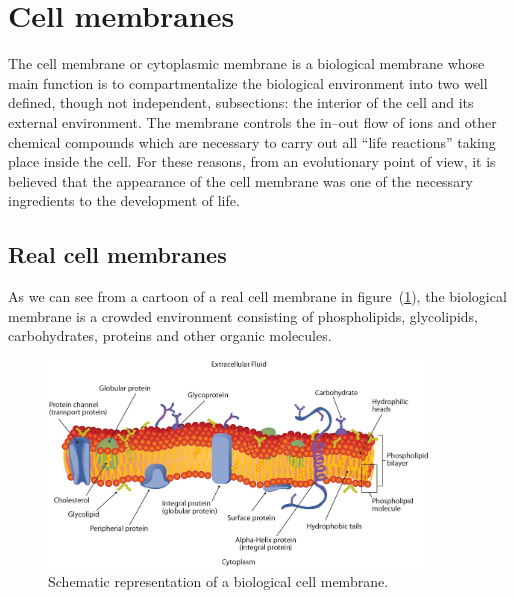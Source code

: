 \section{Cell membranes}
The cell membrane or cytoplasmic membrane is a biological membrane whose main function is to compartmentalize the 
biological environment into two well defined, though not independent, subsections: the interior of the cell and 
its external environment. The membrane controls the in--out flow of ions and other chemical compounds which are 
necessary to carry out all ``life reactions'' taking place inside the cell. For these reasons, from an 
evolutionary point of view, it is believed that the appearance of the cell membrane was one of the necessary 
ingredients to the development of life.

\subsection{Real cell membranes}
As we can see from a cartoon of a real cell membrane in figure~(\ref{fig:cellMembrane}), the biological membrane 
is a crowded environment consisting of phospholipids, glycolipids, carbohydrates, proteins and other organic 
molecules.
\begin{figure}[!ht]
	\centering
	\includegraphics[width=0.9\textwidth]{./img/cellMembrane}
	\caption{Schematic representation of a biological cell membrane.}
	\label{fig:cellMembrane}
\end{figure}

